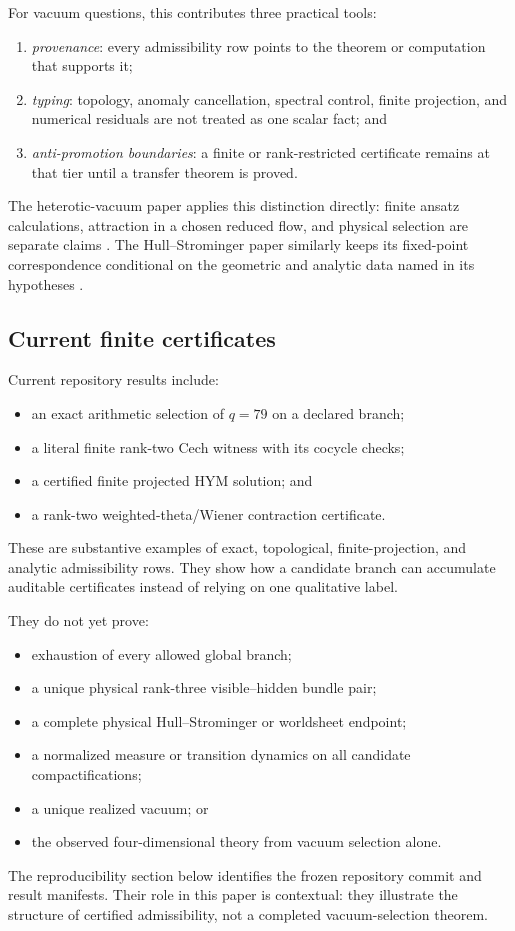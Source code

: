 \documentclass[11pt]{article}
\theoremstyle{definition}
\theoremstyle{remark}
\newcommand{\1}{\mathbf 1}
\begin{document}
For vacuum questions, this contributes three practical tools:
\begin{enumerate}[leftmargin=2em]
\item \emph{provenance}: every admissibility row points to the theorem or
      computation that supports it;
\item \emph{typing}: topology, anomaly cancellation, spectral control,
      finite projection, and numerical residuals are not treated as one
      scalar fact; and
\item \emph{anti-promotion boundaries}: a finite or rank-restricted
      certificate remains at that tier until a transfer theorem is proved.
\end{enumerate}

The heterotic-vacuum paper applies this distinction directly: finite ansatz
calculations, attraction in a chosen reduced flow, and physical selection
are separate claims \cite{MTTHeteroticSelection2026}.  The
Hull--Strominger paper similarly keeps its fixed-point correspondence
conditional on the geometric and analytic data named in its hypotheses
\cite{MTTStrominger2026}.

\subsection{Current finite certificates}

Current repository results include:
\begin{itemize}[leftmargin=2em]
\item an exact arithmetic selection of \(q=79\) on a declared branch;
\item a literal finite rank-two Cech witness with its cocycle checks;
\item a certified finite projected HYM solution; and
\item a rank-two weighted-theta/Wiener contraction certificate.
\end{itemize}
These are substantive examples of exact, topological, finite-projection,
and analytic admissibility rows.  They show how a candidate branch can
accumulate auditable certificates instead of relying on one qualitative
label.

They do not yet prove:
\begin{itemize}[leftmargin=2em]
\item exhaustion of every allowed global branch;
\item a unique physical rank-three visible--hidden bundle pair;
\item a complete physical Hull--Strominger or worldsheet endpoint;
\item a normalized measure or transition dynamics on all candidate
      compactifications;
\item a unique realized vacuum; or
\item the observed four-dimensional theory from vacuum selection alone.
\end{itemize}
The reproducibility section below identifies the frozen repository commit
and result manifests.  Their role in this paper is contextual: they
illustrate the structure of certified admissibility, not a completed
vacuum-selection theorem.
\end{document}
